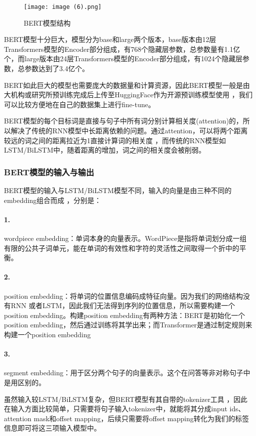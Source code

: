 \documentclass{article}
\begin{document}
\begin{figure}[H]
	\centering
    \texttt{[image: image (6).png]}
    \caption{BERT模型结构}
    \label{fig:BERT}
\end{figure}

BERT模型十分巨大，模型分为base和large两个版本，base版本由12层Transformers模型的Encoder部分组成，有768个隐藏层参数，总参数量有1.1亿个，而large版本由24层Transformers模型的Encoder部分组成，有1024个隐藏层参数，总参数达到了3.4亿个。

BERT如此巨大的模型也需要庞大的数据量和计算资源，因此BERT模型一般是由大机构或研究所预训练完成后上传至HuggingFace作为开源预训练模型使用\cite{wolf2019huggingface} ，我们可以比较方便地在自己的数据集上进行fine-tune。

BERT模型的每个目标词是直接与句子中所有词分别计算相关度(attention)的，所以解决了传统的RNN模型中长距离依赖的问题。通过attention，可以将两个距离较远的词之间的距离拉近为1直接计算词的相关度\cite{clark2019does} ，而传统的RNN模型如LSTM/BiLSTM中，随着距离的增加，词之间的相关度会被削弱。
\subsubsection{BERT模型的输入与输出}
BERT模型的输入与LSTM/BiLSTM模型不同，输入的向量是由三种不同的embedding组合而成\cite{devlin2018bert} ，分别是：
\paragraph{1.}  wordpiece embedding：单词本身的向量表示。WordPiece是指将单词划分成一组有限的公共子词单元，能在单词的有效性和字符的灵活性之间取得一个折中的平衡。
\paragraph{2.} position embedding：将单词的位置信息编码成特征向量。因为我们的网络结构没有RNN 或者LSTM，因此我们无法得到序列的位置信息，所以需要构建一个position embedding。构建position embedding有两种方法：BERT是初始化一个position embedding，然后通过训练将其学出来；而Transformer是通过制定规则来构建一个position embedding
\paragraph{3.} segment embedding：用于区分两个句子的向量表示。这个在问答等非对称句子中是用区别的。

虽然输入较LSTM/BiLSTM复杂，但BERT模型有其自带的tokenizer工具\cite{devlin2018bert} ，因此在输入方面比较简单，只需要将句子输入tokenizer中，就能将其分成input ids、attention mask和offset mapping，后续只需要将offset mapping转化为我们的标签信息即可将这三项输入模型中。
\end{document}
